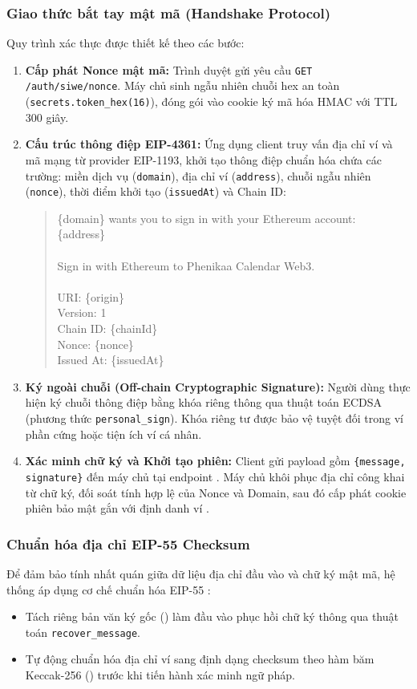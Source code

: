 \documentclass[11pt,a4paper]{article}
\begin{document}
\subsubsection{Giao thức bắt tay mật mã (Handshake Protocol)}
Quy trình xác thực được thiết kế theo các bước:
\begin{enumerate}
    \item \textbf{Cấp phát Nonce mật mã:} Trình duyệt gửi yêu cầu \texttt{GET /auth/siwe/nonce}. Máy chủ sinh ngẫu nhiên chuỗi hex an toàn (\texttt{secrets.token\_hex(16)}), đóng gói vào cookie  ký mã hóa HMAC với TTL 300 giây.
    \item \textbf{Cấu trúc thông điệp EIP-4361:} Ứng dụng client truy vấn địa chỉ ví và mã mạng từ provider EIP-1193, khởi tạo thông điệp chuẩn hóa chứa các trường: miền dịch vụ (\texttt{domain}), địa chỉ ví (\texttt{address}), chuỗi ngẫu nhiên (\texttt{nonce}), thời điểm khởi tạo (\texttt{issuedAt}) và Chain ID:
    \begin{quote}
    \small\ttfamily
    \{domain\} wants you to sign in with your Ethereum account:\\
    \{address\}\\
    \\
    Sign in with Ethereum to Phenikaa Calendar Web3.\\
    \\
    URI: \{origin\}\\
    Version: 1\\
    Chain ID: \{chainId\}\\
    Nonce: \{nonce\}\\
    Issued At: \{issuedAt\}
    \end{quote}
    \item \textbf{Ký ngoài chuỗi (Off-chain Cryptographic Signature):} Người dùng thực hiện ký chuỗi thông điệp bằng khóa riêng thông qua thuật toán ECDSA (phương thức \texttt{personal\_sign}). Khóa riêng tư được bảo vệ tuyệt đối trong ví phần cứng hoặc tiện ích ví cá nhân.
    \item \textbf{Xác minh chữ ký và Khởi tạo phiên:} Client gửi payload gồm \texttt{\{message, signature\}} đến máy chủ tại endpoint . Máy chủ khôi phục địa chỉ công khai từ chữ ký, đối soát tính hợp lệ của Nonce và Domain, sau đó cấp phát cookie phiên bảo mật gắn với định danh ví .
\end{enumerate}

\subsubsection{Chuẩn hóa địa chỉ EIP-55 Checksum}
Để đảm bảo tính nhất quán giữa dữ liệu địa chỉ đầu vào và chữ ký mật mã, hệ thống áp dụng cơ chế chuẩn hóa EIP-55 \cite{eip55}:
\begin{itemize}
    \item Tách riêng bản văn ký gốc () làm đầu vào phục hồi chữ ký thông qua thuật toán \texttt{recover\_message}.
    \item Tự động chuẩn hóa địa chỉ ví sang định dạng checksum theo hàm băm Keccak-256 () trước khi tiến hành xác minh ngữ pháp.
\end{itemize}
\end{document}
